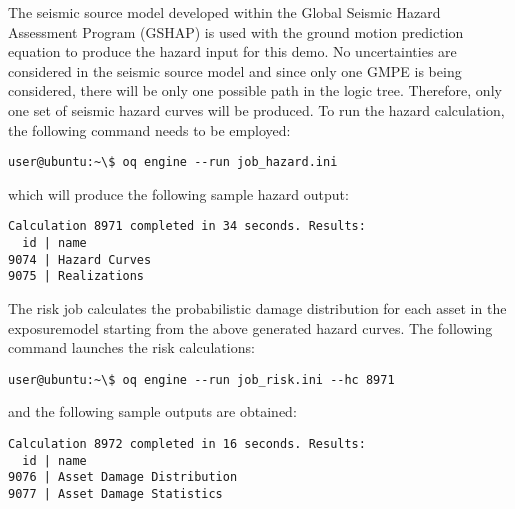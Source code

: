 The seismic source model developed within the Global Seismic Hazard Assessment
Program (GSHAP) is used with the \cite{chiou2008} ground motion prediction
equation to produce the hazard input for this demo. No uncertainties are
considered in the seismic source model and since only one GMPE is being
considered, there will be only one possible path in the logic tree. Therefore,
only one set of seismic hazard curves will be produced. To run the hazard
calculation, the following command needs to be employed:

\begin{verbatim}
user@ubuntu:~\$ oq engine --run job_hazard.ini
\end{verbatim}

which will produce the following sample hazard output:

\begin{verbatim}
Calculation 8971 completed in 34 seconds. Results:
  id | name
9074 | Hazard Curves
9075 | Realizations
\end{verbatim}

The risk job calculates the probabilistic damage distribution for each asset
in the \gls{exposuremodel} starting from the above generated hazard curves. The
following command launches the risk calculations:

\begin{verbatim}
user@ubuntu:~\$ oq engine --run job_risk.ini --hc 8971
\end{verbatim}

and the following sample outputs are obtained:

\begin{verbatim}
Calculation 8972 completed in 16 seconds. Results:
  id | name
9076 | Asset Damage Distribution
9077 | Asset Damage Statistics
\end{verbatim}
